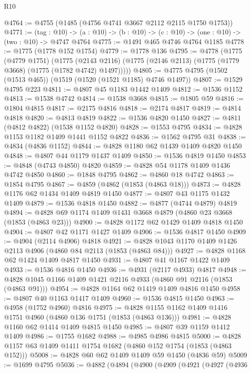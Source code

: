 \begin{lexlean}{R10}
\begin{coremodule}
@4764 := @4755 (@1485 (@4756 @4741 @3667 @2112 @2115 @1750 @1753))
@4771 := (tag : @10) ->
  (a : @10) -> (b : @10) -> (c : @10) -> (one : @10) -> (two : @10) -> @4747 @4764
@4775 := @1491 @465 @4746 @4764 @1185
@4778 := @1775 (@1778 @152 @1754)
@4779 := @1778 @136
@4795 := @4778
    (@1775
      (@4779 @1751)
      (@1775 (@2143 @2116) (@1775 (@2146 @2113) (@1775 (@1779 @3668) (@1775 (@1782 @4742) @1497)))))
@4805 := @4775 @4795 (@1502 (@1513 @465)) (@1519 (@1520 (@1521 @1185) @4746 @1497))
@4807 := @1529 @4795 @223
@4811 := @4807 @45 @1183 @1442 @1409
@4812 := @1536 @1152
@4813 := @1538 @4742
@4814 := @1538 @3668
@4815 := @1805 @59
@4816 := @1804 @4815
@4817 := @2175 @4816
@4818 := @2174 @4817
@4819 := @4814 @4818
@4820 := @4813 @4819
@4822 := @1536 @4820 @1450
@4827 := @4811 (@4812 @4822) (@1538 @1152 @4820)
@4828 := @1553 @4795
@4834 := @4828 @1153 @1182 @1409 @1441 @1152 @4822
@4836 := @1562 @4795 @31
@4838 := @4834 (@4836 @1152)
@4844 := @4828 @1180 @62 @1439 @1409 @4820 @1450
@4848 := @4807 @44 @1179 @1437 @1409
@4850 := @1536 @4819 @1450
@4853 := @4848 (@4743 @4850) @4820
@4859 := @4828 @54 @1178 @1409 @1436 @4742 @4850
@4860 := @1848 @4795
@4862 := @4860 @18 @4742
@4863 := @1854 @4795
@4867 := @4859 (@4862 (@1853 (@4863 @18)))
@4873 := @4828 @1176 @62 @1434 @1409 @4819 @1450
@4877 := @4807 @43 @1175 @1432 @1409
@4879 := @1536 @4818 @1450
@4882 := @4877 (@4744 @4879) @4819
@4894 := @4828 @69 @1174 @1409 @1431 @3668 @4879 (@4860 @23 @3668 (@1853 (@4863 @23)))
@4900 := @4828 @1172 @62 @1429 @1409 @4818 @1450
@4904 := @4807 @42 @1171 @1427 @1409
@4906 := @1536 @4817 @1450
@4909 := @4904 (@2114 @4906) @4818
@4921 := @4828 @1043 @1170 @1409 @1426 @2113 @4906 (@4860 @84 @2113 (@1853 (@4863 @84)))
@4927 := @4828 @1168 @62 @1424 @1409 @4817 @1450
@4931 := @4807 @41 @1167 @1422 @1409
@4933 := @1536 @4816 @1450
@4936 := @4931 (@2117 @4933) @4817
@4948 := @4828 @1045 @1166 @1409 @1421 @2116 @4933 (@4860 @91 @2116 (@1853 (@4863 @91)))
@4954 := @4828 @1164 @62 @1419 @1409 @4816 @1450
@4958 := @4807 @40 @1163 @1417 @1409
@4960 := @1536 @4815 @1450
@4963 := @4958 (@1752 @4960) @4816
@4975 := @4828 @1155 @1162 @1409 @1416 @1751 @4960 (@4860 @136 @1751 (@1853 (@4863 @136)))
@4981 := @4828 @1160 @62 @1414 @1409 @4815 @1450
@4985 := @4807 @39 @1159 @1412 @1409
@4986 := @1755 @1682
@4988 := @4985 @4986 @4815
@5000 := @4828 @1157 @63 @1409 @1411 @1754 @1682 (@4860 @152 @1754 (@1853 (@4863 @152)))
@5008 := @4828 @60 @62 @1409 @1409 @59 @1450 (@4836 @59)
@5009 := @1699 @4795
@5036 := @4882
    (@4894
      (@4900
        (@4909
          (@4921
            (@4927
              (@4936

\end{coremodule}
\end{lexlean}
